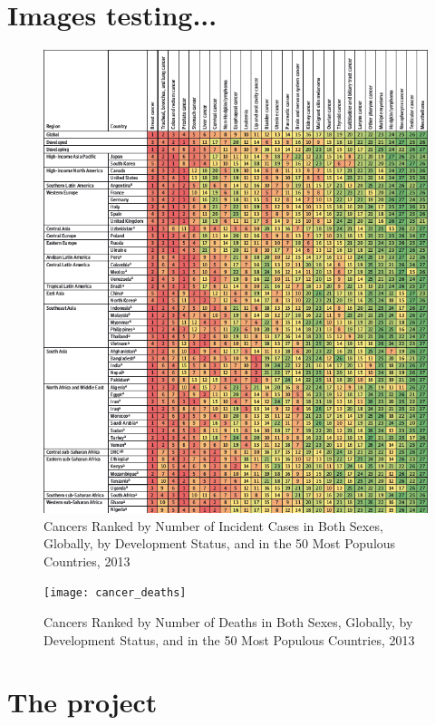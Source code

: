 \documentclass[UKenglish]{ifimaster}
\begin{document}

\part{Images testing...}
\begin{figure}[h]
    \caption{Cancers Ranked by Number of Incident Cases in Both Sexes, Globally, by Development Status, and in the 50
            Most Populous Countries, 2013}
    \includegraphics{cancer_incidents}
\end{figure}

\begin{figure}[h]
    \caption{Cancers Ranked by Number of Deaths in Both Sexes, Globally, by Development Status, and in the 50 Most
            Populous Countries, 2013}
    \texttt{[image: cancer\_deaths]}
\end{figure}

\part{The project}
\end{document}
